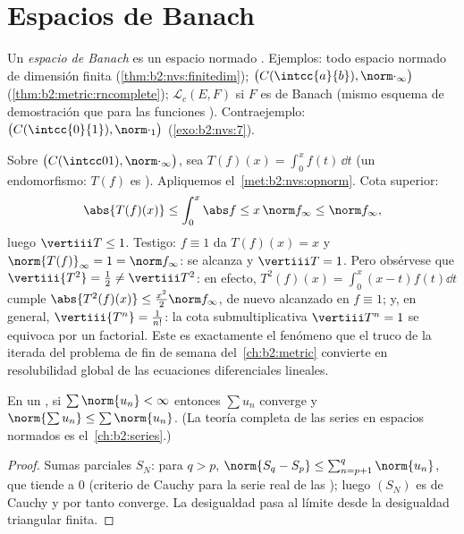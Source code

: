 \section{Espacios de Banach}

\begin{definition}\label{def:b2:nvs:banach}
Un \emph{espacio de Banach} es un espacio
normado . Ejemplos: todo espacio normado de dimensión
finita (\cref{thm:b2:nvs:finitedim}); $\bigl(C(\intcc{a}{b}),
\norm\cdot_\infty\bigr)$ (\cref{thm:b2:metric:rncomplete});
$\mathcal{L}_c(E, F)$ si $F$ es de Banach (mismo esquema de
demostración que para las funciones ). Contraejemplo:
$\bigl(C(\intcc{0}{1}), \norm\cdot_1\bigr)$ (\cref{exo:b2:nvs:7}).
\end{definition}

\begin{example}\label{ex:b2:nvs:integrationnorm}
Sobre $\bigl(C(\intcc01), \norm\cdot_\infty\bigr)$, sea $T(f)(x) =
\int_0^x f(t)\,\dd t$ (un endomorfismo: $T(f)$ es ).
Apliquemos el~\cref{met:b2:nvs:opnorm}. Cota superior:
\[
\abs{T(f)(x)} \leq \int_0^x\abs f \leq x\,\norm f_\infty \leq
\norm f_\infty ,
\]
luego $\vertiii T \leq 1$. Testigo: $f \equiv 1$ da $T(f)(x) = x$ y
$\norm{T(f)}_\infty = 1 = \norm f_\infty$: se alcanza y $\vertiii T
= 1$. Pero obsérvese que $\vertiii{T^2} = \frac12 \neq \vertiii
T^2$: en efecto, $T^2(f)(x) = \int_0^x(x - t)f(t)\dd t$ cumple
$\abs{T^2(f)(x)} \leq \frac{x^2}2\norm f_\infty$, de nuevo
alcanzado en $f \equiv 1$; y, en general, $\vertiii{T^n} =
\frac1{n!}$: la cota submultiplicativa $\vertiii T^n = 1$ se
equivoca por un factorial. Este es exactamente el fenómeno que el
truco de la iterada del problema de fin de semana del~\cref{ch:b2:metric} convierte en resolubilidad global de las
ecuaciones diferenciales lineales.
\end{example}

\begin{theorem}\label{thm:b2:nvs:absoluteconvergence}
En un , si $\sum \norm{u_n} < \infty$ entonces
$\sum u_n$ converge y $\norm{\sum u_n} \leq \sum\norm{u_n}$. (La
teoría completa de las series en espacios normados es el~\cref{ch:b2:series}.)
\end{theorem}

\begin{proof}
Sumas parciales $S_N$: para $q > p$, $\norm{S_q - S_p} \leq
\sum_{n=p+1}^{q}\norm{u_n}$, que tiende a $0$ (criterio de Cauchy
para la serie real de las ); luego $(S_N)$ es de Cauchy y
por tanto converge. La desigualdad pasa al límite desde la
desigualdad triangular finita.
\end{proof}

